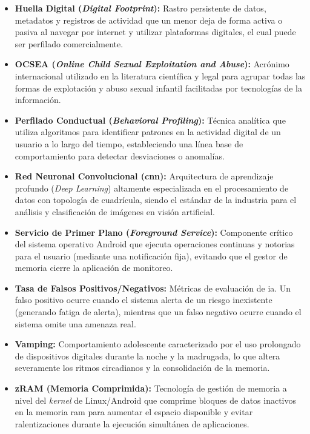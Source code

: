 \begin{itemize}
    \item[] \textbf{Huella Digital (\textit{Digital Footprint}):} Rastro persistente de datos, metadatos y registros de actividad que un menor deja de forma activa o pasiva al navegar por internet y utilizar plataformas digitales, el cual puede ser perfilado comercialmente. \\

    \item[] \textbf{OCSEA (\textit{Online Child Sexual Exploitation and Abuse}):} Acrónimo internacional utilizado en la literatura científica y legal para agrupar todas las formas de explotación y abuso sexual infantil facilitadas por tecnologías de la información. \\

    \item[] \textbf{Perfilado Conductual (\textit{Behavioral Profiling}):} Técnica analítica que utiliza algoritmos para identificar patrones en la actividad digital de un usuario a lo largo del tiempo, estableciendo una línea base de comportamiento para detectar desviaciones o anomalías. \\

    \item[] \textbf{Red Neuronal Convolucional (\gls{cnn}):} Arquitectura de aprendizaje profundo (\textit{Deep Learning}) altamente especializada en el procesamiento de datos con topología de cuadrícula, siendo el estándar de la industria para el análisis y clasificación de imágenes en visión artificial. \\

    \item[] \textbf{Servicio de Primer Plano (\textit{Foreground Service}):} Componente crítico del sistema operativo Android que ejecuta operaciones continuas y notorias para el usuario (mediante una notificación fija), evitando que el gestor de memoria cierre la aplicación de monitoreo. \\

    \item[] \textbf{Tasa de Falsos Positivos/Negativos:} Métricas de evaluación de \gls{ia}. Un falso positivo ocurre cuando el sistema alerta de un riesgo inexistente (generando fatiga de alerta), mientras que un falso negativo ocurre cuando el sistema omite una amenaza real. \\

    \item[] \textbf{Vamping:} Comportamiento adolescente caracterizado por el uso prolongado de dispositivos digitales durante la noche y la madrugada, lo que altera severamente los ritmos circadianos y la consolidación de la memoria. \\

    \item[] \textbf{zRAM (Memoria Comprimida):} Tecnología de gestión de memoria a nivel del \textit{kernel} de Linux/Android que comprime bloques de datos inactivos en la memoria \gls{ram} para aumentar el espacio disponible y evitar ralentizaciones durante la ejecución simultánea de aplicaciones. \\
\end{itemize}